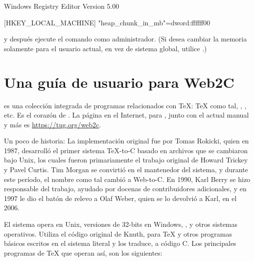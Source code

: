 \documentclass{article}
\begin{document}
\begin{sverbatim}
Windows Registry Editor Version 5.00

[HKEY_LOCAL_MACHINE\Software\Cygwin]
"heap_chunk_in_mb"=dword:ffffff00   
\end{sverbatim}

\noindent y después ejecute el comando  como
administrador. (Si desea cambiar la memoria solamente para el usuario
actual, en vez de sistema global, utilice .)

\section{Una guía de usuario para Web2C}

\Webc{} es una colección integrada de programas relacionados con \TeX{}:
\TeX{} como tal, \MP{}, \BibTeX{}, etc. Es el corazón de \TL{}. La
página en el Internet, para \Webc{}, junto con el actual manual y más es
\url{https://tug.org/web2c}.

Un poco de historia: La implementación original fue por Tomas Rokicki,
quien en 1987, desarrolló el primer sistema \TeX{}-to-C basado en archivos
que se cambiaron bajo Unix, los cuales fueron primariamente el trabajo
original de Howard Trickey y Pavel Curtis. Tim Morgan se convirtió en el
mantenedor del sistema, y durante este período, el nombre como tal cambió
a Web-to-C\@. En 1990, Karl Berry se hizo responsable del trabajo, ayudado
por docenas de contribuidores adicionales, y en 1997 le dio el batón de
relevo a Olaf Weber, quien se lo devolvió a Karl, en el 2006.

El sistema \Webc{} opera en Unix, versiones de 32-bits en Windows,
\MacOSX{}, y otros sistemas operativos. Utiliza el código original de
Knuth, para \TeX{} y otros programas básicos escritos en el sistema
literal \web{} y los traduce, a código C. Los principales programas de
\TeX{} que operan así, son los siguientes:
\end{document}
